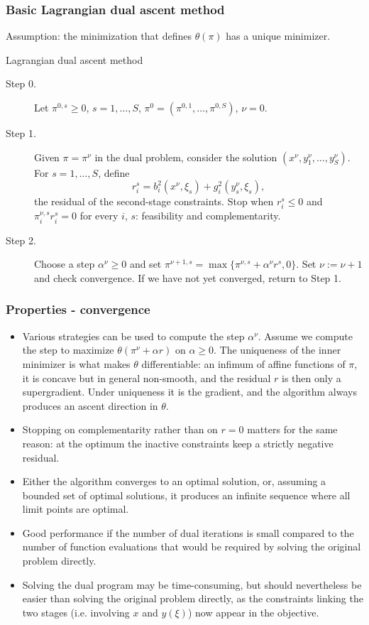 \documentclass[aspectratio=169]{beamer}
\begin{document}
\begin{frame}
\frametitle{Basic Lagrangian dual ascent method}
\small

Assumption: the minimization that defines $\theta(\pi)$ has a {\red unique} minimizer.

\begin{algo}{Lagrangian dual ascent method}
\begin{description}
\item[Step 0.] Let $\pi^{0,s} \geq 0$, $s = 1,\ldots,S$, $\pi^0 = (\pi^{0,1},\ldots,\pi^{0,S})$, $\nu = 0$.
\item[Step 1.]
Given $\pi = \pi^{\nu}$ in the dual problem, consider the solution
$(x^{\nu}, y_1^{\nu},\ldots{},y_S^{\nu})$.
For $s = 1, \ldots{}, S$, define
$$
r_i^s = b_i^2(x^{\nu},\xi_s)+g_i^2(y_s^{\nu},\xi_s),
$$
the residual of the second-stage constraints. Stop when $r_i^s \leq 0$ and $\pi_i^{\nu,s} r_i^s = 0$ for every $i$, $s$: feasibility and complementarity.
\item[Step 2.]
Choose a step $\alpha^{\nu} \geq 0$ and set
$
\pi^{\nu+1,s} = \max\{\pi^{\nu,s} + \alpha^{\nu}r^s, 0\}.
$
Set $\nu := \nu+1$ and check convergence. If we have not yet converged, return to Step 1.
\end{description}
\end{algo}

\end{frame}

\begin{frame}
\frametitle{Properties - convergence}
\small

\begin{itemize}
\item
Various strategies can be used to compute the step $\alpha^\nu$. Assume we compute the step to maximize $\theta(\pi^{\nu}+\alpha r)$ on $\alpha \geq 0$.
The uniqueness of the inner minimizer is what makes $\theta$ {\red differentiable}: an infimum of affine functions of $\pi$, it is concave but in general non-smooth, and the residual $r$ is then only a supergradient. Under uniqueness it is the gradient, and the algorithm always produces an {\blue ascent direction} in $\theta$.
\item
Stopping on complementarity rather than on $r = 0$ matters for the same reason: at the optimum the inactive constraints keep a strictly negative residual.
\item
Either the algorithm converges to an optimal solution, or, assuming a bounded set of optimal solutions, it produces an infinite sequence where all limit points are optimal.
\item
Good performance if the number of dual iterations is small compared to the number of function evaluations that would be required by solving the original problem directly.
\item
Solving the dual program may be time-consuming, but should nevertheless be easier than solving the original problem directly, as the constraints linking the two stages (i.e. involving $x$ and $y(\xi)$) now appear in the objective.
\end{itemize}

\end{frame}
\end{document}
